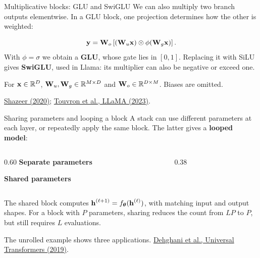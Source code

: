 \documentclass[12pt,aspectratio=169]{beamer}
\begin{document}
\begin{frame}{Multiplicative blocks: GLU and SwiGLU}
	\small
	\setlength{\parskip}{3pt}
	\setlength{\abovedisplayskip}{5pt}
	\setlength{\belowdisplayskip}{5pt}
	We can also multiply two branch outputs elementwise. In a GLU block,
	one projection determines how the other is weighted:

	\begin{center}
		
	\end{center}
	\[
		\boldsymbol{\mathbf{y}}=\boldsymbol{\mathbf{W}}_o\left[(\boldsymbol{\mathbf{W}}_u\boldsymbol{\mathbf{x}})\odot\phi(\boldsymbol{\mathbf{W}}_g\boldsymbol{\mathbf{x}})\right].
	\]
	With $\phi=\sigma$ we obtain a \textbf{GLU}, whose gate lies in $[0,1]$.
	Replacing it with SiLU gives \textbf{SwiGLU}, used in Llama: its multiplier
	can also be negative or exceed one.

		{\footnotesize For $\boldsymbol{\mathbf{x}}\in\mathbb{R}^{D}$,
			$\boldsymbol{\mathbf{W}}_u,\boldsymbol{\mathbf{W}}_g\in\mathbb{R}^{M\times D}$ and $\boldsymbol{\mathbf{W}}_o\in\mathbb{R}^{D\times M}$.
			Biases are omitted.\par}
	\vfill
	{\tiny\color{drawgray}
		\href{https://arxiv.org/abs/2002.05202}{Shazeer (2020)};
		\href{https://arxiv.org/abs/2302.13971}{Touvron et al., LLaMA (2023)}.\par}
\end{frame}

\begin{frame}{Sharing parameters and looping a block}
	\small
	\setlength{\parskip}{3pt}
	\setlength{\abovedisplayskip}{5pt}
	\setlength{\belowdisplayskip}{5pt}
	A stack can use different parameters at each layer, or repeatedly apply
	the same block. The latter gives a \textbf{looped model}:\vspace{0.5em}

	\begin{columns}[c,onlytextwidth]
		\begin{column}{0.60\textwidth}
			\textbf{Separate parameters}
			\begin{center}
				
			\end{center}
			\textbf{Shared parameters}
			\begin{center}
				
			\end{center}
		\end{column}
		\begin{column}{0.38\textwidth}
			\centering
			
		\end{column}
	\end{columns}

	The shared block computes $\boldsymbol{\mathbf{h}}^{(\ell+1)}=f_{\boldsymbol{\theta}}(\boldsymbol{\mathbf{h}}^{(\ell)})$,
	with matching input and output shapes. For a block with $P$ parameters,
	sharing reduces the count from $LP$ to $P$, but still requires $L$ evaluations.
	\vfill
	{\tiny\color{drawgray}
		The unrolled example shows three applications.
		\href{https://arxiv.org/abs/1807.03819}{Dehghani et al., Universal Transformers (2019)}.\par}
\end{frame}
\end{document}
